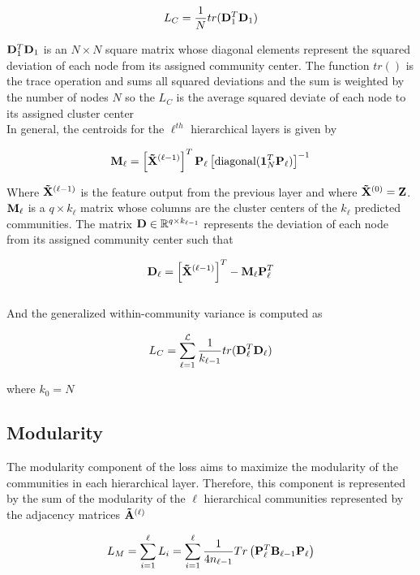 \documentclass[a4paper,12pt]{article}
\begin{document}
					\[L_C = \frac{1}{N} tr({\bf D}_1^T {\bf D}_1)\]
					
					${\bf D}_1^T {\bf D}_1$ is an $N\times N$ square matrix whose diagonal elements represent the squared deviation of each node from its assigned community center. The function $tr()$ is the trace operation and sums all squared deviations and the sum is weighted by the number of nodes $N$ so the $L_C$ is the average squared deviate of each node to its assigned cluster center\\
					
					In general, the centroids for the $\ell^{th}$ hierarchical layers is given by
					
					\[ {\bf M_\ell} = \left[{\bf \tilde X}^{(\ell-1)}\right]^T{\bf P}_\ell \left[\text{diagonal}({\bf 1}_N^T {\bf P}_\ell)\right]^{-1}\]
					
					Where ${\bf \tilde X}^{(\ell-1)}$ is the feature output from the previous layer and where ${\bf \tilde X}^{(0)} = {\bf Z}$. $\bf M_\ell$ is a $q\times k_\ell$ matrix whose columns are the cluster centers of the $k_\ell$ predicted communities. The matrix ${\bf D}\in\mathbb{R}^{q\times k_{\ell-1}}$ represents the deviation of each node from its assigned community center such that
					
					\[ {\bf D}_\ell =\left[{\bf \tilde X}^{(\ell-1)}\right]^T - {\bf M}_\ell{\bf P}_\ell^T \]\\
					
					And the generalized within-community variance is computed as 
					
					\[L_C = \sum_{\ell=1}^\mathcal{L} \frac{1}{k_{\ell-1}} tr({\bf D}_\ell^T {\bf D}_\ell)\]
					
					where $k_0 = N$ \\
				
					
				\subsection*{Modularity}
					
					The modularity component of the loss aims to maximize the modularity of the communities in each hierarchical layer. Therefore, this component is represented by the sum of the modularity of the $\ell$ hierarchical communities represented by the adjacency matrices ${\bf \tilde A}^{(\ell)}$
					
					\[L_M = \sum_{i = 1}^{\ell} L_i =  \sum_{i=1}^\ell \frac{1}{4n_{\ell-1}}Tr\left({\bf P}_\ell^T {\bf B}_{\ell-1} {\bf P}_\ell\right)\]
					
\end{document}
